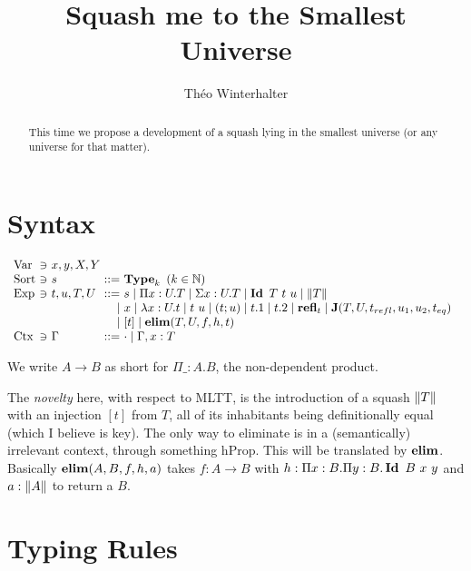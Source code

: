\documentclass[a4paper,english]{lipics-utf8x}
\title{Squash me to the Smallest Universe}
\author[1]{Théo Winterhalter}
\begin{document}
  \maketitle

  \begin{abstract}
    This time we propose a development of a squash lying in the smallest
    universe (or any universe for that matter).
  \end{abstract}

  \section{Syntax}

  \[
    \begin{array}{l@{~}l@{~}l@{~}r@{~}l@{\quad}l}
      \Var  & \ni & x,y,X,Y \\
      \Sort & \ni & s             & ::= & \Type_k \mbox{ }
                                                (k \in \mathbb{N}) \\
      \Exp  & \ni & t,u,T,U & ::= & s \mid \Pi x:U.T \mid \Sigma x:U.T \mid
                                    \Id T\ t\ u \mid \squash{T} \\
                         &&& \mid & x \mid \lambda x:U.t \mid t~u
                               \mid (t;u) \mid t.1 \mid t.2 \mid \refl_t \mid
                               \J (T,U,t_{refl},u_1,u_2,t_{eq}) \\
                         &&& \mid & [t] \mid \elim(T,U,f,h,t) \\
      \Ctx  & \ni & \Gamma  & ::= & \cdot \mid \Gamma, x:T \\
    \end{array}
  \]

  \noindent %
  We write $A \to B$ as short for $\Pi \_:A.B$, the non-dependent product.

  The \emph{novelty} here, with respect to MLTT, is the introduction of a squash
  $\|T\|$ with an injection $[t]$ from $T$, all of its inhabitants being
  definitionally equal (which I believe is key). The only way to eliminate is
  in a (semantically) irrelevant context, \ie through something hProp.
  This will be translated by $\operatorname{\mathbf{elim}}$.
  Basically $\operatorname{\mathbf{elim}}(A,B,f,h,a)$ takes $f : A \to B$ with
  $h : \Pi x:B. \Pi y:B. \Id B\ x\ y$ and $a : \|A\|$ to return a $B$.

  \section{Typing Rules}
\end{document}
